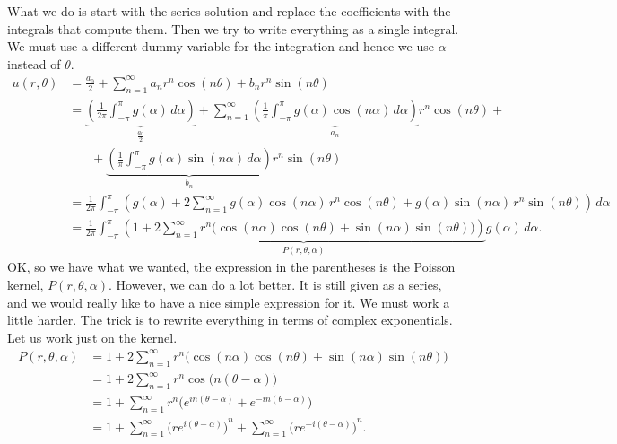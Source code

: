 What we do is start with the series solution and replace the coefficients
with the integrals that compute them.  Then we try to write everything as
a single integral.  We must use a different dummy variable for the
integration and hence we use $\alpha$ instead of $\theta$.
\begin{equation*}
\begin{split}
u(r,\theta)
& =
\frac{a_0}{2} +
\sum_{n=1}^\infty
a_n r^n \cos(n \theta) + b_n r^n \sin(n \theta)
\\
& =
\underbrace{
 \left(
  \frac{1}{2\pi} \int_{-\pi}^\pi g(\alpha) \, d\alpha
 \right)
}_{\frac{a_0}{2}}
+
\sum_{n=1}^\infty
\underbrace{
 \left(
  \frac{1}{\pi} \int_{-\pi}^\pi g(\alpha) \cos (n\alpha) \, d\alpha
 \right)
}_{a_n}
r^n \cos(n \theta) +
\\
& ~~~~~~~~ +
\underbrace{
 \left(
  \frac{1}{\pi} \int_{-\pi}^\pi g(\alpha) \sin (n\alpha) \, d\alpha
 \right)
}_{b_n}
r^n \sin(n \theta)
\\
& =
\frac{1}{2\pi}
\int_{-\pi}^\pi
\left(  g(\alpha)
+
2
\sum_{n=1}^\infty
g(\alpha) \cos (n\alpha) 
\, r^n \cos(n \theta) +
g(\alpha) \sin (n\alpha)
\, r^n \sin(n \theta)
\right) \,d\alpha
\\
& =
\frac{1}{2\pi}
\int_{-\pi}^\pi
\underbrace{
 \left( 1
 +
 2
 \sum_{n=1}^\infty
 r^n 
 \bigl(
 \cos (n\alpha) 
 \cos(n \theta) +
 \sin (n\alpha)
 \sin(n \theta) \bigr)
 \right)
}_{P(r,\theta,\alpha)}
g(\alpha) \,d\alpha .
\end{split}
\end{equation*}
OK\@, so we have what we wanted, the expression in the parentheses is the
Poisson kernel, $P(r,\theta,\alpha)$.  However, we can do a lot better.  It is still given as a
series, and we would really like to have a nice simple expression for it. 
We must work a little harder.  The trick is to rewrite everything in terms of
complex exponentials.  Let us work
just on the kernel.
\begin{equation*}
\begin{split}
P(r,\theta,\alpha)
& =
1
+
2
\sum_{n=1}^\infty
r^n 
\bigl(
\cos (n\alpha) 
\cos(n \theta) +
\sin (n\alpha)
\sin(n \theta) \bigr)
\\
& =
1
+
2
\sum_{n=1}^\infty
r^n 
\cos \bigl(n(\theta-\alpha)\bigr)
\\
& =
1
+
\sum_{n=1}^\infty
r^n 
\bigl(
e^{in(\theta-\alpha)} +
e^{-in(\theta-\alpha)} \bigr)
\\
& =
1
+
\sum_{n=1}^\infty
{\bigl(
re^{i(\theta-\alpha)}\bigr)}^{n}
+
\sum_{n=1}^\infty
{\bigl(
re^{-i(\theta-\alpha)}\bigr)}^{n} .
\end{split}
\end{equation*}
